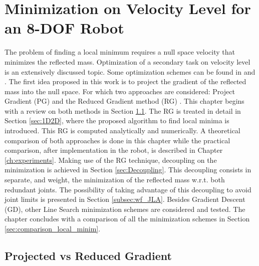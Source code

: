 \chapter{Minimization on Velocity Level for an 8-DOF Robot}
\label{ch:velocity}

The problem of finding a local minimum requires a null space velocity that minimizes the reflected mass.
Optimization of a secondary task on velocity level is an extensively discussed topic. Some optimization schemes can be found in \cite{opt_vel_level_1} and \cite{opt_vel_level_2}.  The first idea proposed in this work is to project the gradient of the reflected mass into the null space. For which two approaches are considered: Project Gradient (PG) \cite{JLA_1} and the Reduced Gradient method (RG) \cite{PG_RG}. This chapter begins with a review on both methods in Section \ref{sec:PGvsRG}.
 The RG is treated in detail in Section \ref{sec:1D2D}, where the proposed algorithm to find local minima is introduced. This RG is computed analytically and numerically.  
 A theoretical comparison of both approaches is done in this chapter while the practical comparison, after implementation in the robot, is described in  Chapter \ref{ch:experiments}. Making use of the RG technique, decoupling on the minimization is achieved in Section \ref{sec:Decoupling}. This decoupling consists in separate, and weight, the minimization of the reflected mass w.r.t. both redundant joints. The possibility of taking advantage of this decoupling to avoid joint limits is presented in Section \ref{subsec:wf_JLA}.
Besides Gradient Descent (GD),  other Line Search minimization schemes are considered and tested. The chapter concludes with a comparison of all the minimization schemes in  Section \ref{sec:comparison_local_minim}.
 
 


\section{Projected vs Reduced Gradient}
\label{sec:PGvsRG}

